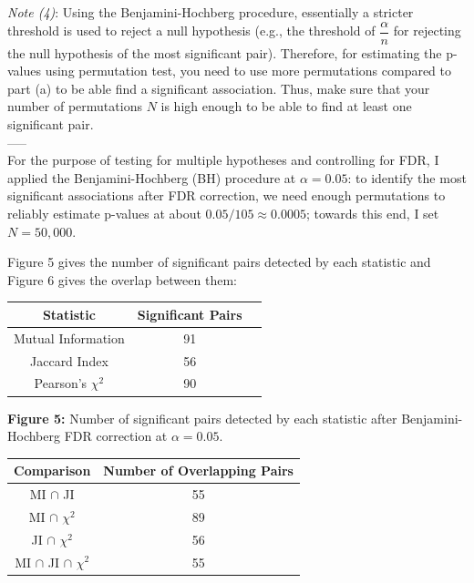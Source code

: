 \vspace{0.2cm}
\noindent
\textit{Note (4)}: Using the Benjamini-Hochberg procedure, essentially a stricter threshold is used to reject a null hypothesis (e.g., the threshold of $\dfrac{\alpha}{n}$ for rejecting the null hypothesis of the most significant pair). Therefore, for estimating the p-values using permutation test, you need to use more permutations compared to part (a) to be able find a significant association. Thus, make sure that your number of permutations $N$ is high enough to be able to find at least one significant pair.\\
-----\\

For the purpose of testing for multiple hypotheses and controlling for FDR, I applied the Benjamini-Hochberg (BH) procedure at $ \alpha = 0.05 $: to identify the most significant associations after FDR correction, we need enough permutations to reliably estimate p-values at about $ 0.05/105  \approx  0.0005 $; towards this end, I set $ N = 50,000 $.

Figure 5 gives the number of significant pairs detected by each statistic and Figure 6 gives the overlap between them:

\begin{center}
\begin{tabular}{|c|c|c|}
\hline
\textbf{Statistic} & \textbf{Significant Pairs} \\
\hline
Mutual Information & 91 \\
\hline
Jaccard Index & 56 \\
\hline
Pearson's $\chi^2$ & 90 \\
\hline
\end{tabular}
\end{center}

\begin{center}
\textbf{Figure 5:} Number of significant pairs detected by each statistic after Benjamini-Hochberg FDR correction at $\alpha = 0.05$.
\end{center}

\begin{center}
\begin{tabular}{|c|c|}
\hline
\textbf{Comparison} & \textbf{Number of Overlapping Pairs} \\
\hline
MI $\cap$ JI & 55 \\
\hline
MI $\cap$ $\chi^2$ & 89 \\
\hline
JI $\cap$ $\chi^2$ & 56 \\
\hline
MI $\cap$ JI $\cap$ $\chi^2$ & 55 \\
\hline
\end{tabular}
\end{center}

